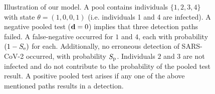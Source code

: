 \documentclass{article}
\begin{document}

\begin{figure}[H]
  \centering
  \caption{Illustration of our model. A pool contains individuals
    $\{1,2,3,4\}$ with state $\theta=(1,0,0,1)$ (i.e. individuals 1
    and 4 are infected). A negative pooled test ($\mathbf{d}=0$) implies
    that three detection paths failed. A false-negative occurred for
    $1$ and $4$, each with probability $(1-S_{\text{e}})$ for
    each. Additionally, no erroneous detection of SARS-CoV-2 occurred,
    with probability $S_{\text{p}}$. Individuals $2$ and $3$ are not infected
    and do not contribute to the probability of the pooled test
    result. A positive pooled test arises if any one of the above
    mentioned paths results in a detection.}\label{fig:likelihood}
\end{figure}
\end{document}

